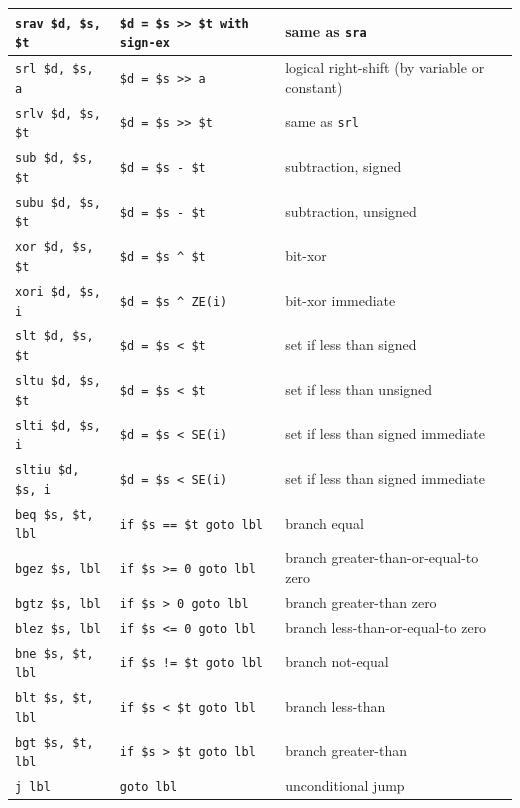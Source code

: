 \documentclass[12pt]{article}
\begin{document}
\begin{longtable}{l || l | l}
    \texttt{srav  \$d, \$s, \$t} & \texttt{\$d = \$s >> \$t with sign-ex} & same as \texttt{sra}\\ \hline
    \texttt{srl   \$d, \$s, a} & \texttt{\$d = \$s >> a} & logical right-shift (by variable or constant)\\ \hline
    \texttt{srlv  \$d, \$s, \$t} & \texttt{\$d = \$s >> \$t} & same as \texttt{srl}\\ \hline
    \texttt{sub   \$d, \$s, \$t} & \texttt{\$d = \$s - \$t} & subtraction, signed\\ \hline
    \texttt{subu  \$d, \$s, \$t} & \texttt{\$d = \$s - \$t} & subtraction, unsigned\\ \hline
    \texttt{xor   \$d, \$s, \$t} & \texttt{\$d = \$s \^{} \$t} & bit-xor\\ \hline
    \texttt{xori  \$d, \$s, i} & \texttt{\$d = \$s \^{} ZE(i)} & bit-xor immediate\\
    \hhline{=#=|=}
    \texttt{slt   \$d, \$s, \$t} & \texttt{\$d = \$s < \$t} & set if less than signed\\ \hline
    \texttt{sltu  \$d, \$s, \$t} & \texttt{\$d = \$s < \$t} & set if less than unsigned\\ \hline
    \texttt{slti  \$d, \$s, i} & \texttt{\$d = \$s < SE(i)} & set if less than signed immediate\\ \hline
    \texttt{sltiu \$d, \$s, i} & \texttt{\$d = \$s < SE(i)} & set if less than signed immediate\\
    \hhline{=#=|=}
    \texttt{beq   \$s, \$t, lbl} & \texttt{if \$s == \$t goto lbl} & branch equal\\ \hline
    \texttt{bgez  \$s, lbl} & \texttt{if \$s >= 0 goto lbl} & branch greater-than-or-equal-to zero\\ \hline
    \texttt{bgtz  \$s, lbl} & \texttt{if \$s > 0 goto lbl} & branch greater-than zero\\ \hline
    \texttt{blez  \$s, lbl} & \texttt{if \$s <= 0 goto lbl} & branch less-than-or-equal-to zero\\ \hline
    \texttt{bne   \$s, \$t, lbl} & \texttt{if \$s != \$t goto lbl} & branch not-equal\\ \hline
    \texttt{blt   \$s, \$t, lbl} & \texttt{if \$s < \$t goto lbl} & branch less-than\\
    \texttt{bgt   \$s, \$t, lbl} & \texttt{if \$s > \$t goto lbl} & branch greater-than\\
    \hhline{=#=|=}
    \texttt{j     lbl} & \texttt{goto lbl} & unconditional jump\\ \hline

\end{longtable}
\end{document}
